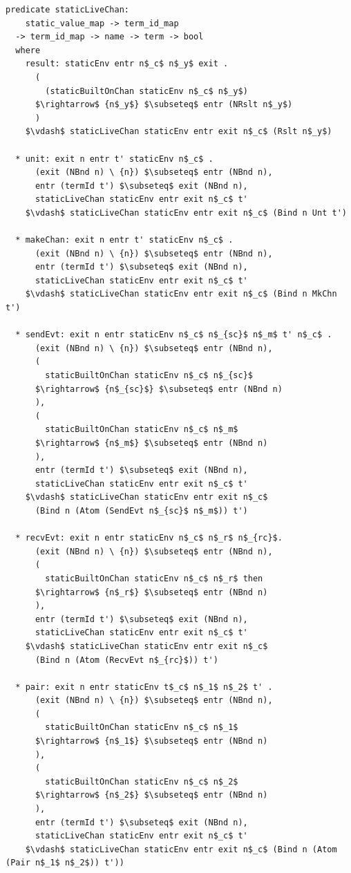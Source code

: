 \documentclass[letterpaper, 11pt]{extarticle}
\begin{document}
\begin{lstlisting}[language=logic, mathescape]
  predicate staticLiveChan:
    static_value_map -> term_id_map 
  -> term_id_map -> name -> term -> bool
  where
    result: staticEnv entr n$_c$ n$_y$ exit .
      (
        (staticBuiltOnChan staticEnv n$_c$ n$_y$)
      $\rightarrow$ {n$_y$} $\subseteq$ entr (NRslt n$_y$)
      )
    $\vdash$ staticLiveChan staticEnv entr exit n$_c$ (Rslt n$_y$)

  * unit: exit n entr t' staticEnv n$_c$ .
      (exit (NBnd n) \ {n}) $\subseteq$ entr (NBnd n),
      entr (termId t') $\subseteq$ exit (NBnd n),
      staticLiveChan staticEnv entr exit n$_c$ t'
    $\vdash$ staticLiveChan staticEnv entr exit n$_c$ (Bind n Unt t')

  * makeChan: exit n entr t' staticEnv n$_c$ .
      (exit (NBnd n) \ {n}) $\subseteq$ entr (NBnd n),
      entr (termId t') $\subseteq$ exit (NBnd n),
      staticLiveChan staticEnv entr exit n$_c$ t'
    $\vdash$ staticLiveChan staticEnv entr exit n$_c$ (Bind n MkChn t')

  * sendEvt: exit n entr staticEnv n$_c$ n$_{sc}$ n$_m$ t' n$_c$ .
      (exit (NBnd n) \ {n}) $\subseteq$ entr (NBnd n),
      (
        staticBuiltOnChan staticEnv n$_c$ n$_{sc}$
      $\rightarrow$ {n$_{sc}$} $\subseteq$ entr (NBnd n)
      ),
      (
        staticBuiltOnChan staticEnv n$_c$ n$_m$
      $\rightarrow$ {n$_m$} $\subseteq$ entr (NBnd n)
      ),
      entr (termId t') $\subseteq$ exit (NBnd n),
      staticLiveChan staticEnv entr exit n$_c$ t'
    $\vdash$ staticLiveChan staticEnv entr exit n$_c$
      (Bind n (Atom (SendEvt n$_{sc}$ n$_m$)) t')

  * recvEvt: exit n entr staticEnv n$_c$ n$_r$ n$_{rc}$.   
      (exit (NBnd n) \ {n}) $\subseteq$ entr (NBnd n),
      (
        staticBuiltOnChan staticEnv n$_c$ n$_r$ then
      $\rightarrow$ {n$_r$} $\subseteq$ entr (NBnd n)
      ),
      entr (termId t') $\subseteq$ exit (NBnd n),
      staticLiveChan staticEnv entr exit n$_c$ t'
    $\vdash$ staticLiveChan staticEnv entr exit n$_c$
      (Bind n (Atom (RecvEvt n$_{rc}$)) t')

  * pair: exit n entr staticEnv t$_c$ n$_1$ n$_2$ t' .
      (exit (NBnd n) \ {n}) $\subseteq$ entr (NBnd n),
      (
        staticBuiltOnChan staticEnv n$_c$ n$_1$
      $\rightarrow$ {n$_1$} $\subseteq$ entr (NBnd n)
      ),
      (
        staticBuiltOnChan staticEnv n$_c$ n$_2$
      $\rightarrow$ {n$_2$} $\subseteq$ entr (NBnd n)
      ),
      entr (termId t') $\subseteq$ exit (NBnd n),
      staticLiveChan staticEnv entr exit n$_c$ t'
    $\vdash$ staticLiveChan staticEnv entr exit n$_c$ (Bind n (Atom (Pair n$_1$ n$_2$)) t'))


\end{lstlisting}
\end{document}

